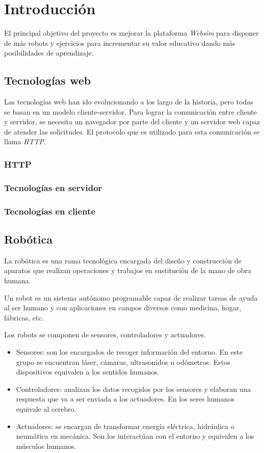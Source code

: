 
\chapter{Introducción}
\label{chap:intro} 
El principal objetivo del proyecto es mejorar la plataforma \textit{Websim} para disponer de más robots y ejercicios para incrementar su valor educativo dando más posibilidades de aprendizaje. 
   
 \section{Tecnologías web}
\label{sec:web}
Las tecnologías web han ido evolucionando a los largo de la historia, pero todas se basan en un modelo cliente-servidor. Para lograr la comunicación entre cliente y servidor, se necesita un navegador por parte del cliente y un servidor web capaz de atender las solicitudes. El protocolo que es utilizado para esta comunicación se llama \textit{HTTP}.
\subsection{HTTP}
\label{subsec:http}

\subsection{Tecnologías en servidor}
\label{subsec:tecserver}

\subsection{Tecnologías en cliente}
\label{subsec:tecclient}


\section{Robótica}
\label{sec:robotica}
La robótica es una rama tecnológica encargada del diseño y construcción de aparatos que realizan operaciones y trabajos en sustitución de la mano de obra humana. 

Un robot es un sistema autónomo programable capaz de realizar tareas de ayuda al ser humano y con aplicaciones en campos diversos como medicina, hogar, fábricas, etc. 

Los robots se componen de sensores, controladores y actuadores.
\begin{itemize}
    \item Sensores: son los encargados de recoger información del entorno. En este grupo se encuentran láser, cámaras, ultrasonidos u odómetros. Estos dispositivos equivalen a los sentidos humanos. 
    \item Controladores: analizan los datos recogidos por los sensores y elaboran una respuesta que va a ser enviada a los actuadores. En los seres humanos equivale al cerebro. 
    \item Actuadores: se encargan de transformar energía eléctrica, hidráulica o neumática en mecánica. Son los interactúan con el entorno y equivalen a los músculos humanos. 
\end{itemize}

